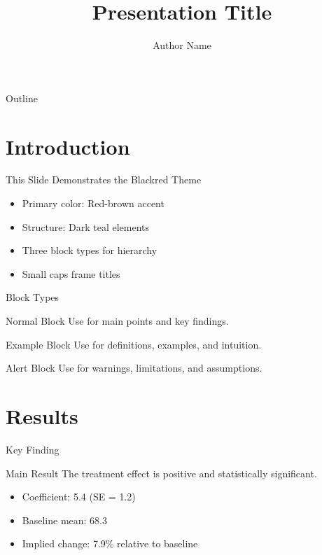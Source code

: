 \documentclass[10pt]{beamer}
\title[]{Presentation Title}
\author[]{Author Name}
\institute[]{Institution Name}
\date{}
\begin{document}
\begin{frame}
  \titlepage
\end{frame}

\begin{frame}{Outline}
  \tableofcontents
\end{frame}

\section{Introduction}

\begin{frame}{This Slide Demonstrates the Blackred Theme}
  \begin{itemize}
    \item Primary color: Red-brown accent
    \item Structure: Dark teal elements
    \item Three block types for hierarchy
    \item Small caps frame titles
  \end{itemize}
\end{frame}

\begin{frame}{Block Types}
  \begin{block}{Normal Block}
    Use for main points and key findings.
  \end{block}
  
  \begin{exampleblock}{Example Block}
    Use for definitions, examples, and intuition.
  \end{exampleblock}
  
  \begin{alertblock}{Alert Block}
    Use for warnings, limitations, and assumptions.
  \end{alertblock}
\end{frame}

\section{Results}

\begin{frame}{Key Finding}
  \begin{block}{Main Result}
    The treatment effect is positive and statistically significant.
  \end{block}
  
  \begin{itemize}
    \item Coefficient: 5.4 (SE = 1.2)
    \item Baseline mean: 68.3
    \item Implied change: 7.9\% relative to baseline
  \end{itemize}
\end{frame}
\end{document}
